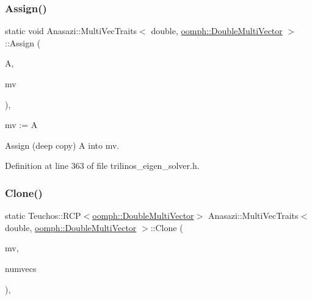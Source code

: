 \subsubsection{\texorpdfstring{Assign()}{Assign()}}
{\footnotesize\ttfamily static void Anasazi\+::\+Multi\+Vec\+Traits$<$ double, \hyperlink{classoomph_1_1DoubleMultiVector}{oomph\+::\+Double\+Multi\+Vector} $>$\+::Assign (\begin{DoxyParamCaption}\item[{const \hyperlink{classoomph_1_1DoubleMultiVector}{oomph\+::\+Double\+Multi\+Vector} \&}]{A,  }\item[{\hyperlink{classoomph_1_1DoubleMultiVector}{oomph\+::\+Double\+Multi\+Vector} \&}]{mv }\end{DoxyParamCaption})\hspace{0.3cm}{\ttfamily [inline]}, {\ttfamily [static]}}



mv \+:= A 

Assign (deep copy) A into mv. 

Definition at line 363 of file trilinos\+\_\+eigen\+\_\+solver.\+h.

\mbox{\label{classAnasazi_1_1MultiVecTraits_3_01double_00_01oomph_1_1DoubleMultiVector_01_4_ab98d6c0005dd90d02ddb1d89b2d425bc}} 
\subsubsection{\texorpdfstring{Clone()}{Clone()}}
{\footnotesize\ttfamily static Teuchos\+::\+R\+CP$<$\hyperlink{classoomph_1_1DoubleMultiVector}{oomph\+::\+Double\+Multi\+Vector}$>$ Anasazi\+::\+Multi\+Vec\+Traits$<$ double, \hyperlink{classoomph_1_1DoubleMultiVector}{oomph\+::\+Double\+Multi\+Vector} $>$\+::Clone (\begin{DoxyParamCaption}\item[{const \hyperlink{classoomph_1_1DoubleMultiVector}{oomph\+::\+Double\+Multi\+Vector} \&}]{mv,  }\item[{const int}]{numvecs }\end{DoxyParamCaption})\hspace{0.3cm}{\ttfamily [inline]}, {\ttfamily [static]}}



